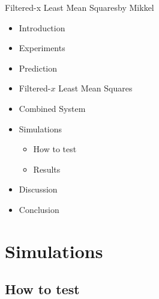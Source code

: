 

\begin{frame}{Filtered-x Least Mean Squares}{by Mikkel}
	\begin{itemize}
		\item[] Introduction
		\item[] Experiments
		\item[] Prediction
		\item[] Filtered-$x$ Least Mean Squares
		\item[] Combined System
		\item[] \textcolor{beamer@headercolor}{Simulations}
		\begin{itemize}
			\item[] \textcolor{beamer@headercolor}{How to test}
			\item[] \textcolor{beamer@headercolor}{Results}
		\end{itemize}
		\item[] \textcolor{beamer@headercolor}{Discussion}
		\item[] \textcolor{beamer@headercolor}{Conclusion}
	\end{itemize}
\end{frame}


\section{Simulations}
\subsection{How to test}

